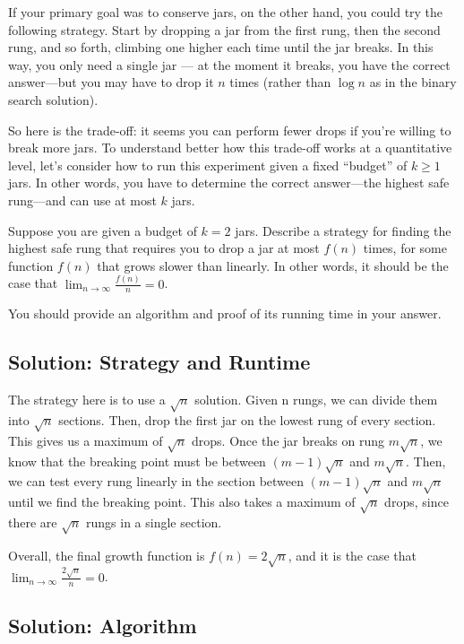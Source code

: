 \documentclass[11pt]{article}
\begin{document}
If your primary goal was to conserve jars, on the other hand, you could try the following strategy. Start by dropping a jar from the first rung, then the second rung, and so forth, climbing one higher each time until the jar breaks. In this way, you only need a single jar — at the moment it breaks, you have the correct answer—but you may have to drop it $n$ times (rather than $\log{n}$ as in the binary search solution).

So here is the trade-off: it seems you can perform fewer drops if you're willing to break more jars. To understand better how this trade-off works at a quantitative level, let's consider how to run this experiment given a fixed ``budget'' of $k \geq 1$ jars. In other words, you have to determine the correct answer—the highest safe rung---and can use at most $k$ jars.

Suppose you are given a budget of $k=2$ jars. Describe a strategy for finding the highest safe rung that requires you to drop a jar at most $f(n)$ times, for some function $f(n)$ that grows slower than linearly. In other words, it should be the case that $\lim_{n\rightarrow\infty} \frac{f(n)}{n} = 0$.

You should provide an algorithm and proof of its running time in your answer.

\subsection{Solution: Strategy and Runtime}

The strategy here is to use a $\sqrt{n}$ solution. Given n rungs, we can divide them into $\sqrt{n}$ sections. Then, drop the first jar on the lowest rung of every section. This gives us a maximum of $\sqrt{n}$ drops. Once the jar breaks on rung $m\sqrt{n}$, we know that the breaking point must be between $(m-1)\sqrt{n}$ and $m\sqrt{n}$. Then, we can test every rung linearly in the section between $(m-1)\sqrt{n}$ and $m\sqrt{n}$ until we find the breaking point. This also takes a maximum of $\sqrt{n}$ drops, since there are $\sqrt{n}$ rungs in a single section.

Overall, the final growth function is $f(n) = 2\sqrt{n}$, and it is the case that $\lim_{n\rightarrow\infty} \frac{2\sqrt{n}}{n} = 0$.

\subsection{Solution: Algorithm}
\end{document}
